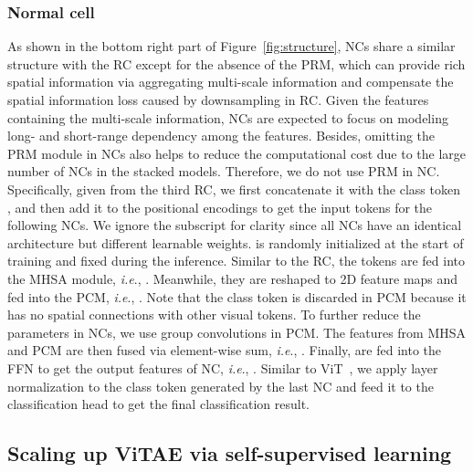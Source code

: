 \documentclass[twocolumn]{svjour3}          \smartqed  \usepackage{natbib}
\newcommand{\ie}{i.e}
\def\onedot{.\xspace}
\def\ie{\emph{i.e}\onedot}
\begin{document}
\subsubsection{Normal cell}
As shown in the bottom right part of Figure~\ref{fig:structure}, NCs share a similar structure with the RC except for the absence of the PRM, which can provide rich spatial information via aggregating multi-scale information and compensate the spatial information loss caused by downsampling in RC. Given the features containing the multi-scale information, NCs are expected to focus on modeling long- and short-range dependency among the features. Besides, omitting the PRM module in NCs also helps to reduce the computational cost due to the large number of NCs in the stacked models. Therefore, we do not use PRM in NC. Specifically, given  from the third RC, we first concatenate it with the class token , and then add it to the positional encodings to get the input tokens  for the following NCs. We ignore the subscript for clarity since all NCs have an identical architecture but different learnable weights.  is randomly initialized at the start of training and fixed during the inference. Similar to the RC, the tokens are fed into the MHSA module, \ie, . Meanwhile, they are reshaped to 2D feature maps and fed into the PCM, \ie, . Note that the class token is discarded in PCM because it has no spatial connections with other visual tokens.
To further reduce the parameters in NCs, we use group convolutions in PCM. The features from MHSA and PCM are then fused via element-wise sum, \ie, . 
Finally,  are fed into the FFN to get the output features of NC, \ie, .
Similar to ViT~\citep{dosovitskiy2020image}, we apply layer normalization to the class token generated by the last NC and feed it to the classification head to get the final classification result. 

\subsection{Scaling up ViTAE via self-supervised learning}
\end{document}

